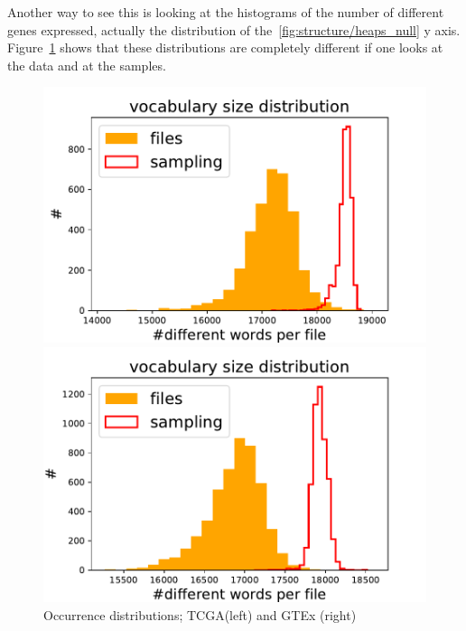 Another way to see this is looking at the histograms of the number of different genes expressed, actually the distribution of the~\ref{fig:structure/heaps_null} y axis. Figure~\ref{fig:structure/diffwordsDistr_null} shows that these distributions are completely different if one looks at the data and at the samples.
\begin{figure}[htb!]
\begin{minipage}{0.5\textwidth}
    \centering
    \includegraphics[width=0.95\linewidth]{pictures/structure/tcga/diffwordsDistr_null.pdf}
    \end{minipage}
\hspace{2mm}
\begin{minipage}{0.5\textwidth}
    \centering
    \includegraphics[width=0.95\linewidth]{pictures/structure/gtex/diffwordsDistr_null.pdf}
    \end{minipage}
\caption{Occurrence distributions; TCGA(left) and GTEx (right)}
\label{fig:structure/diffwordsDistr_null}
\end{figure}